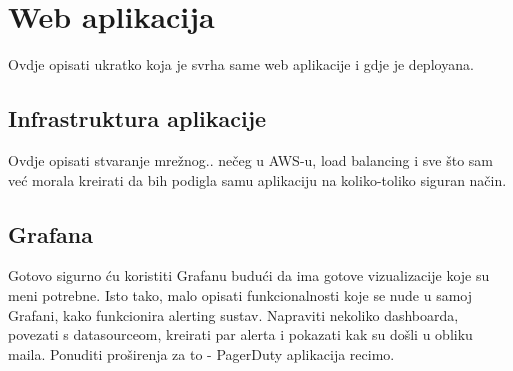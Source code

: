 \chapter{Web aplikacija}

Ovdje opisati ukratko koja je svrha same web aplikacije i gdje je deployana. 

\section{Infrastruktura aplikacije}

Ovdje opisati stvaranje mrežnog.. nečeg u AWS-u, load balancing i sve što sam već morala kreirati da bih podigla samu aplikaciju na koliko-toliko siguran način. 

\section{Grafana}

Gotovo sigurno ću koristiti Grafanu budući da ima gotove vizualizacije koje su meni potrebne. Isto tako, malo opisati funkcionalnosti koje se nude u samoj Grafani, kako funkcionira alerting sustav. Napraviti nekoliko dashboarda, povezati s datasourceom, kreirati par alerta i pokazati kak su došli u obliku maila. Ponuditi proširenja za to - PagerDuty aplikacija recimo.